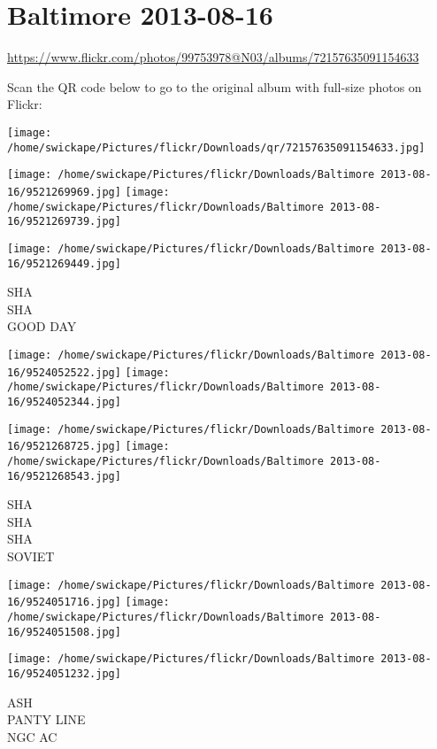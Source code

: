 \documentclass[10pt,letterpaper]{article}
\title{}
\author{}
\date{}
\begin{document}
\section*{Baltimore 2013-08-16}

\url{https://www.flickr.com/photos/99753978@N03/albums/72157635091154633}

Scan the QR code below to go to the original album with full-size photos on Flickr:

\texttt{[image: /home/swickape/Pictures/flickr/Downloads/qr/72157635091154633.jpg]}
\pagebreak

\texttt{[image: /home/swickape/Pictures/flickr/Downloads/Baltimore 2013-08-16/9521269969.jpg]}
\texttt{[image: /home/swickape/Pictures/flickr/Downloads/Baltimore 2013-08-16/9521269739.jpg]}

\vspace{0.25in}
\texttt{[image: /home/swickape/Pictures/flickr/Downloads/Baltimore 2013-08-16/9521269449.jpg]}

SHA\\
SHA\\
GOOD DAY
\pagebreak

\texttt{[image: /home/swickape/Pictures/flickr/Downloads/Baltimore 2013-08-16/9524052522.jpg]}
\texttt{[image: /home/swickape/Pictures/flickr/Downloads/Baltimore 2013-08-16/9524052344.jpg]}

\texttt{[image: /home/swickape/Pictures/flickr/Downloads/Baltimore 2013-08-16/9521268725.jpg]}
\texttt{[image: /home/swickape/Pictures/flickr/Downloads/Baltimore 2013-08-16/9521268543.jpg]}

SHA\\
SHA\\
SHA\\
SOVIET
\pagebreak

\texttt{[image: /home/swickape/Pictures/flickr/Downloads/Baltimore 2013-08-16/9524051716.jpg]}
\texttt{[image: /home/swickape/Pictures/flickr/Downloads/Baltimore 2013-08-16/9524051508.jpg]}

\vspace{0.25in}
\texttt{[image: /home/swickape/Pictures/flickr/Downloads/Baltimore 2013-08-16/9524051232.jpg]}

ASH\\
PANTY LINE\\
NGC AC
\pagebreak
\end{document}
